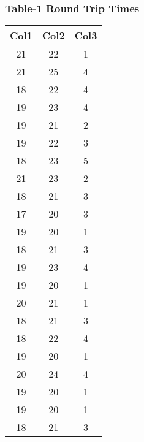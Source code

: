 \documentclass[a4paper, 11pt]{article} 				%
\begin{document}
\subsubsection{\textbf{Table-1} \qquad \qquad Round Trip Times}
\begin{center}
\begin{tabular}{||c c c ||} 
 \hline
 Col1 & Col2 & Col3 \\ [0.5ex] 
 \hline\hline
 21 & 22 & 1 \\ 				%
 \hline
 21 & 25 & 4 \\ 				%
 \hline
 18 & 22 & 4 \\ 				%
 \hline
 19 & 23 & 4 \\ 				%
  \hline
 19 & 21 & 2 \\ 				%
  \hline
 19 & 22 & 3 \\ 				%
  \hline
 18 & 23 & 5 \\ 				%
  \hline
 21 & 23 & 2 \\ 				%
  \hline
 18 & 21 & 3 \\ 				%
  \hline
 17 & 20 & 3 \\ 				%
  \hline
 19 & 20 & 1 \\ 				%
  \hline
 18 & 21 & 3 \\ 				%
  \hline
 19 & 23 & 4 \\ 				%
  \hline
 19 & 20 & 1 \\ 				%
  \hline
 20 & 21 & 1 \\ 				%
  \hline
 18 & 21 & 3 \\ 				%
  \hline
 18 & 22 & 4 \\ 				%
  \hline
 19 & 20 & 1 \\ 				%
  \hline
 20 & 24 & 4 \\ 			%
  \hline
 19 & 20 & 1 \\ 				%
  \hline
 19 & 20 & 1 \\ 				%
 \hline
 18 & 21 & 3 \\ [1ex]  			%
 \hline
\end{tabular}
\end{center}


\end{document}
